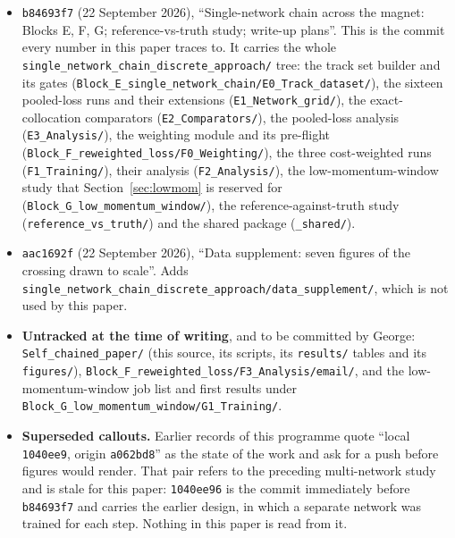 \documentclass[11pt,a4paper]{article}
\begin{document}
\begin{itemize}
  \item \texttt{b84693f7} (22 September 2026), ``Single-network chain across the
  magnet: Blocks E, F, G; reference-vs-truth study; write-up plans''. This is
  the commit every number in this paper traces to. It carries the whole
  \texttt{single\_network\_chain\_discrete\_approach/} tree: the track set
  builder and its gates (\texttt{Block\_E\_single\_network\_chain/}\allowbreak\texttt{E0\_Track\_dataset/}),
  the sixteen pooled-loss runs and their extensions
  (\texttt{E1\_Network\_grid/}), the exact-collocation comparators
  (\texttt{E2\_Comparators/}), the pooled-loss analysis
  (\texttt{E3\_Analysis/}), the weighting module and its pre-flight
  (\texttt{Block\_F\_reweighted\_loss/}\allowbreak\texttt{F0\_Weighting/}), the three
  cost-weighted runs (\texttt{F1\_Training/}), their analysis
  (\texttt{F2\_Analysis/}), the low-momentum-window study that
  Section~\ref{sec:lowmom} is reserved for
  (\texttt{Block\_G\_low\_momentum\_window/}), the reference-against-truth study
  (\texttt{reference\_vs\_truth/}) and the shared package (\texttt{\_shared/}).
  \item \texttt{aac1692f} (22 September 2026), ``Data supplement: seven figures
  of the crossing drawn to scale''. Adds
  \texttt{single\_network\_chain\_discrete\_approach/data\_supplement/}, which
  is not used by this paper.
  \item \textbf{Untracked at the time of writing}, and to be committed by
  George: \texttt{Self\_chained\_paper/} (this source, its scripts, its
  \texttt{results/} tables and its \texttt{figures/}),
  \texttt{Block\_F\_reweighted\_loss/F3\_Analysis/email/}, and the
  low-momentum-window job list and first results under
  \texttt{Block\_G\_low\_momentum\_window/G1\_Training/}.
  \item \textbf{Superseded callouts.} Earlier records of this programme quote
  ``local \texttt{1040ee9}, origin \texttt{a062bd8}'' as the state of the work
  and ask for a push before figures would render. That pair refers to the
  preceding multi-network study and is stale for this paper: \texttt{1040ee96}
  is the commit immediately before \texttt{b84693f7} and carries the earlier
  design, in which a separate network was trained for each step. Nothing in this
  paper is read from it.
\end{itemize}
\end{document}
